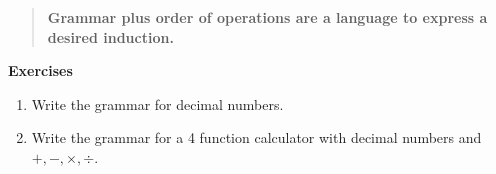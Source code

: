 \begin{quote}
\textbf{Grammar plus order of operations are a language to express a desired induction.}
\end{quote}

\noindent\textbf{Exercises}
\begin{enumerate}
    \item Write the grammar for decimal numbers.
    \item Write the grammar for a 4 function calculator with decimal numbers
    and $+,-,\times, \div$.
\end{enumerate}
\medskip
